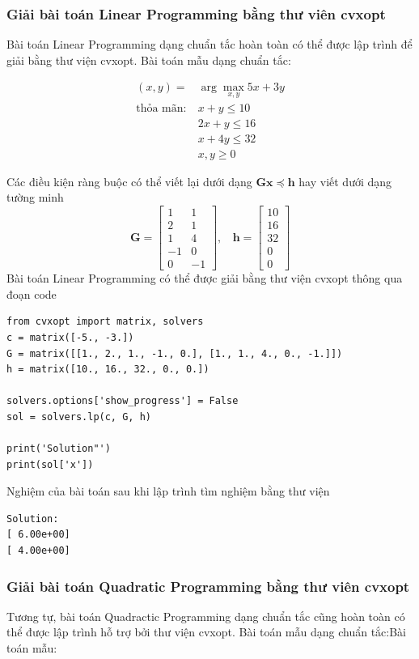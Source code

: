 \documentclass[a4paper, 12pt, oneside]{report}
\begin{document}
\subsubsection{Giải bài toán Linear Programming bằng thư viên cvxopt}
Bài toán Linear Programming dạng chuẩn tắc hoàn toàn có thể được lập trình để giải bằng thư viện cvxopt. 
Bài toán mẫu dạng chuẩn tắc: 
\begin{mybox}
\begin{eqnarray}
(x, y) =& \arg\max_{x, y} 5x + 3y \\
\text{thỏa mãn:}~ & x + y \leq 10 \\
                    & 2x + y \leq 16  \\
                    & x + 4y \leq 32 \\
                    & x, y \geq 0
\end{eqnarray}
\end{mybox}
Các điều kiện ràng buộc có thể viết lại dưới dạng $\mathbf{Gx} \preceq \mathbf{h}$ hay viết dưới dạng tường minh
$$\mathbf{G} = \left[\begin{matrix}
1 & 1 \\
2 & 1 \\
1 & 4 \\
-1 & 0 \\
0 & -1
\end{matrix}\right], ~~~~
\mathbf{h} = \left[\begin{matrix}
10\\
16 \\
32 \\
0 \\
0
\end{matrix}\right] $$
Bài toán Linear Programming có thể được giải bằng thư viện cvxopt thông qua đoạn code
\begin{lstlisting}
from cvxopt import matrix, solvers
c = matrix([-5., -3.])
G = matrix([[1., 2., 1., -1., 0.], [1., 1., 4., 0., -1.]])
h = matrix([10., 16., 32., 0., 0.])

solvers.options['show_progress'] = False
sol = solvers.lp(c, G, h)

print('Solution"')
print(sol['x'])
\end{lstlisting}
Nghiệm của bài toán sau khi lập trình tìm nghiệm bằng thư viện
\begin{lstlisting}
Solution:
[ 6.00e+00]
[ 4.00e+00]
\end{lstlisting}
\subsubsection{Giải bài toán Quadratic Programming bằng thư viên cvxopt}
Tương tự, bài toán Quadractic Programming dạng chuẩn tắc cũng hoàn toàn có thể được lập trình hỗ trợ bởi thư viện cvxopt. 
Bài toán mẫu dạng chuẩn tắc:Bài toán mẫu: 
 
\end{document}
